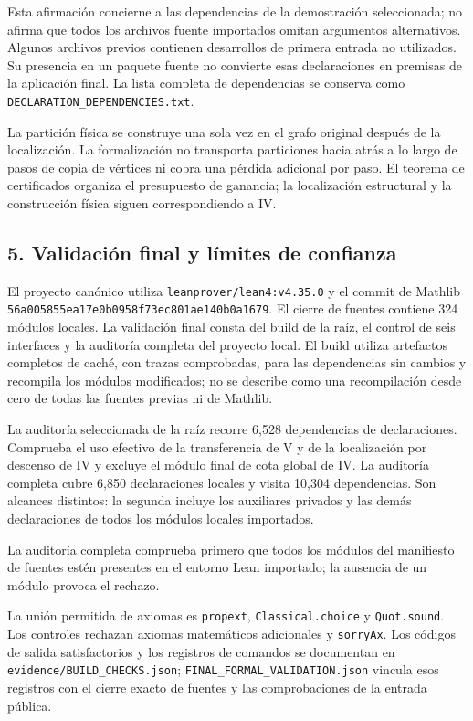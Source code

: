 \documentclass[spanish,11pt,a4paper]{article}
\begin{document}
Esta afirmación concierne a las dependencias de la demostración
seleccionada; no afirma que todos los archivos fuente importados omitan
argumentos alternativos. Algunos archivos previos contienen desarrollos
de primera entrada no utilizados. Su presencia en un paquete fuente no
convierte esas declaraciones en premisas de la aplicación final. La
lista completa de dependencias se conserva como
\nolinkurl{DECLARATION_DEPENDENCIES.txt}.

La partición física se construye una sola vez en el grafo original
después de la localización. La formalización no transporta particiones
hacia atrás a lo largo de pasos de copia de vértices ni cobra una
pérdida adicional por paso. El teorema de certificados organiza el
presupuesto de ganancia; la localización estructural y la construcción
física siguen correspondiendo a IV.

\subsection{5. Validación final y límites de
confianza}\label{validaciuxf3n-final-y-luxedmites-de-confianza}

El proyecto canónico utiliza \nolinkurl{leanprover/lean4:v4.35.0} y el
commit de Mathlib \nolinkurl{56a005855ea17e0b0958f73ec801ae140b0a1679}. El
cierre de fuentes contiene 324 módulos locales. La validación final
consta del build de la raíz, el control de seis interfaces y la
auditoría completa del proyecto local. El build utiliza artefactos
completos de caché, con trazas comprobadas, para las dependencias sin
cambios y recompila los módulos modificados; no se describe como una
recompilación desde cero de todas las fuentes previas ni de Mathlib.

La auditoría seleccionada de la raíz recorre 6,528 dependencias de
declaraciones. Comprueba el uso efectivo de la transferencia de V y de
la localización por descenso de IV y excluye el módulo final de cota
global de IV. La auditoría completa cubre 6,850 declaraciones locales y
visita 10,304 dependencias. Son alcances distintos: la segunda incluye
los auxiliares privados y las demás declaraciones de todos los módulos
locales importados.

La auditoría completa comprueba primero que todos los módulos del
manifiesto de fuentes estén presentes en el entorno Lean importado; la
ausencia de un módulo provoca el rechazo.

La unión permitida de axiomas es \nolinkurl{propext},
\nolinkurl{Classical.choice} y \nolinkurl{Quot.sound}. Los controles rechazan
axiomas matemáticos adicionales y \nolinkurl{sorryAx}. Los códigos de
salida satisfactorios y los registros de comandos se documentan en
\nolinkurl{evidence/BUILD_CHECKS.json};
\nolinkurl{FINAL_FORMAL_VALIDATION.json} vincula esos registros con el
cierre exacto de fuentes y las comprobaciones de la entrada pública.
\end{document}
